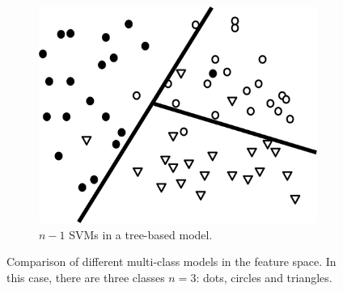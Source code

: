 \begin{figure}
\begin{subfigure}[b]{0.32\textwidth}
            \centering 
            \includegraphics[width=.98\textwidth]{parts/chap-2/img-2/svm-seq.png}
            \caption{$n-1$ SVMs in a tree-based model.} 
            \label{mach:svm-model-gr-3}
        \end{subfigure}
        \caption{Comparison of different multi-class models in the feature space. In this case, there are three classes $n=3$: dots, circles and triangles.}
\end{figure}